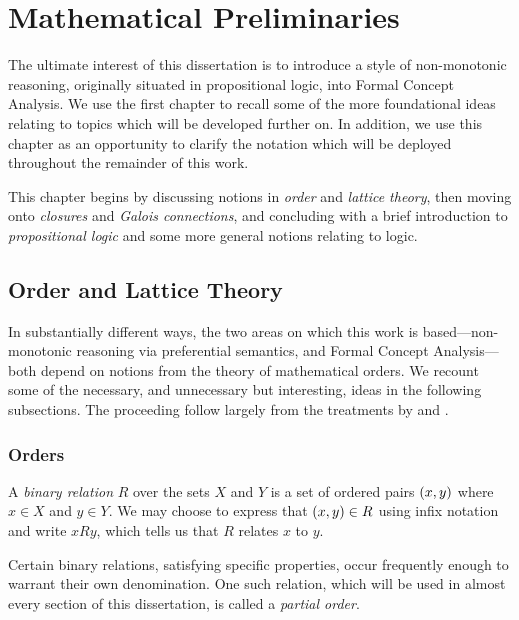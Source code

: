 \chapter{Mathematical Preliminaries}
\label{chapter:mathematical-preliminaries}

The ultimate interest of this dissertation is to introduce a style of non-monotonic reasoning, originally situated in propositional
logic, into Formal Concept Analysis. We use the first chapter to recall some of the more foundational ideas relating to topics
which will be developed further on. In addition, we use this chapter as an opportunity to clarify the notation which will
be deployed throughout the remainder of this work.

This chapter begins by discussing notions in \textit{order} and \textit{lattice theory}, then moving onto \textit{closures}
and \textit{Galois connections}, and concluding with a brief introduction to \textit{propositional logic} and some more
general notions relating to logic.

\section{Order and Lattice Theory}
\label{section:order-theory}

In substantially different ways, the two areas on which this work is based---non-monotonic reasoning via preferential
semantics, and Formal Concept Analysis---both depend on notions from the theory of mathematical orders. We recount some
of the necessary, and unnecessary but interesting, ideas in the following subsections. The proceeding follow largely from
the treatments by \cite{davey2002introduction} and \cite{bergman2015invitation}.

\subsection{Orders}
\label{subsection:orders}

A \textit{binary relation}  $R$ over the sets $X$ and $Y$ is a set of ordered pairs $(x,y)$ where
$x \in X$ and $y \in Y$. We may choose to express that $(x,y)\in R$ using infix notation and write $xRy$, which tells
us that $R$ relates $x$ to $y$.

Certain binary relations, satisfying specific properties, occur frequently enough to warrant their own denomination. One
such relation, which will be used in almost every section of this dissertation, is called a \textit{partial order}.

